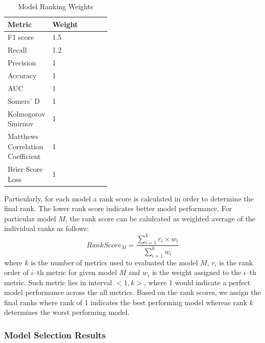\begin{table}[H]
\small
\setlength{\tabcolsep}{8pt}
\renewcommand{\arraystretch}{1.3}
\centering
    \caption[Model Ranking Weights]{Model Ranking Weights}\label{tab:weightsrank}
    \begin{tabular}{>{\raggedleft\arraybackslash}p{0.4\linewidth} l}
\toprule
\textbf{Metric} & \textbf{Weight}\\
\midrule
\hline
F1 score & 1.5 \\
Recall & 1.2 \\
Precision & 1 \\
Accuracy & 1 \\
AUC & 1 \\
Somers' D & 1 \\ 
Kolmogorov Smirnov & 1 \\
Matthews Correlation Coefficient  & 1 \\
Brier Score Loss  & 1 \\
\hline
\bottomrule
\end{tabular}
\vspace{0.7em}

\vspace{-1em}
\end{table}

Particularly, for each model a rank score is calculated in order to determine the final rank. The lower rank score indicates better model performance. For particular model $M$, the rank score can be calulcated as weighted average of the individual ranks as follows:
\begin{equation}\label{eq:rankscorem}
    RankScore_{M} = \frac{\sum_{i=1}^{k} {r_i \times w_i}}{\sum_{i=1}^{k} {w_i}} 
\end{equation}
where $k$ is the number of metrics used to evaluated the model $M$, $r_i$ is the rank order of $i$--th metric for given model $M$ and $w_i$ is the weight assigned to the $i$--th metric.
Such metric lies in interval $<1, k>$, where 1 would indicate a perfect model performance across the all metrics.
Based on the rank scores, we assign the final ranks where rank of 1 indicates the best performing model whereas rank $k$ determines the worst performing model.


\newpage
\subsubsection{Model Selection Results}



